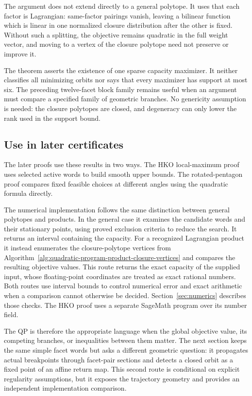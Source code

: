 \begin{remark}
The argument does not extend directly to a general polytope.  It uses that
each factor is Lagrangian: same-factor pairings vanish, leaving a bilinear
function which is linear in one normalized closure distribution after the
other is fixed.  Without such a splitting, the objective remains quadratic in
the full weight vector, and moving to a vertex of the closure polytope need not
preserve or improve it.

The theorem asserts the existence of one sparse capacity maximizer.  It neither
classifies all minimizing orbits nor says that every maximizer has support at
most six.  The preceding twelve-facet block family remains useful when an
argument must compare a specified family of geometric branches.  No
genericity assumption is needed: the closure polytopes are closed, and
degeneracy can only lower the rank used in the support bound.
\end{remark}

\subsection{Use in later certificates}
\label{subsec:quadratic-program-algorithm-hk2019-implementation-status}

The later proofs use these results in two ways.
The HKO local-maximum proof uses selected active words to build smooth upper
bounds. The rotated-pentagon proof compares fixed feasible choices at
different angles using the quadratic formula directly.

The numerical implementation follows the same distinction between general
polytopes and products. In the general case it examines the candidate words
and their stationary points, using proved exclusion criteria to reduce the
search. It returns an interval containing the capacity. For a recognized
Lagrangian product it instead enumerates the closure-polytope vertices from
Algorithm~\ref{alg:quadratic-program-product-closure-vertices} and compares
the resulting objective values. This route returns the exact capacity of
the supplied input, whose floating-point coordinates are treated as exact
rational numbers. Both routes use interval bounds to control numerical error
and exact arithmetic when a comparison cannot otherwise be decided.
Section~\ref{sec:numerics} describes those checks. The HKO proof uses a
separate SageMath program over its number field.

The QP is therefore the appropriate language when the global objective value,
its competing branches, or inequalities between them matter.  The next
section keeps the same simple facet words but asks a different geometric
question: it propagates actual breakpoints through facet-pair sections and
detects a closed orbit as a fixed point of an affine return map.  This second
route is conditional on explicit regularity assumptions, but it exposes the
trajectory geometry and provides an independent implementation comparison.
